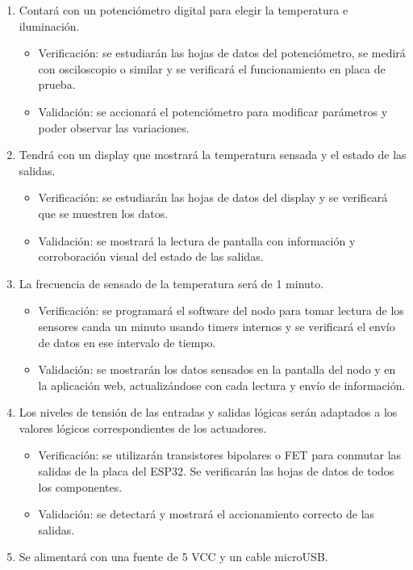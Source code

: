 \documentclass[
11pt, %
]{charter}
\begin{document}
\begin{enumerate}
\begin{enumerate}
\begin{itemize}
			\end{itemize}
			\item Contará con un potenciómetro digital para elegir la temperatura e iluminación.
			\begin{itemize}
				\item Verificación: se estudiarán las hojas de datos del potenciómetro, se medirá con osciloscopio o similar y se verificará el funcionamiento en placa de prueba.
				\item Validación: se accionará el potenciómetro para modificar parámetros y poder observar las variaciones.
			\end{itemize}
			\item Tendrá con un display que mostrará la temperatura sensada y el estado de las salidas.
			\begin{itemize}
				\item Verificación: se estudiarán las hojas de datos del display y se verificará que se muestren los datos.
				\item Validación: se mostrará la lectura de pantalla con información y corroboración visual del estado de las salidas.
			\end{itemize}
			\item La frecuencia de sensado de la temperatura será de 1 minuto.
			\begin{itemize}
				\item Verificación: se programará el software del nodo para tomar lectura de los sensores canda un minuto usando timers internos y se verificará el envío de datos en ese intervalo de tiempo.
				\item Validación: se mostrarán los datos sensados en la pantalla del nodo y en la aplicación web, actualizándose con cada lectura y envío de información.
			\end{itemize}
			\item Los niveles de tensión de las entradas y salidas lógicas serán adaptados a los valores lógicos correspondientes de los actuadores.
			\begin{itemize}
				\item Verificación: se utilizarán transistores bipolares o FET para conmutar las salidas de la placa del ESP32. Se verificarán las hojas de datos de todos los componentes.
				\item Validación: se detectará y mostrará el accionamiento correcto de las salidas.
			\end{itemize}
			\item Se alimentará con una fuente de 5 VCC y un cable microUSB.

\end{enumerate}
\end{enumerate}
\end{document}
